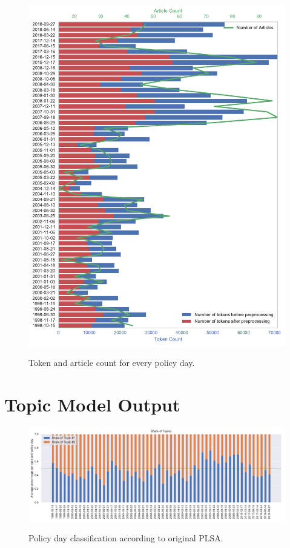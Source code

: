 \documentclass[11pt,a4paper,english,oneside]{book}
\numberwithin{equation}{chapter}
\begin{document}
\begin{figure}
	\caption{Token and article count for every policy day.}
	\centering
	\includegraphics[scale=1]{Images/tokencount.pdf}
	\label{tokencount}
\end{figure}

\renewcommand{\theequation}{C.\arabic{equation}}


\chapter{Topic Model Output}\label{AppendixC}

\begin{figure}
	\caption{Policy day classification according to original PLSA.}
	\centering
	\includegraphics[scale=0.8]{Images/plsamodelling_orig.pdf}
	\label{classPLSA}
\end{figure}
\end{document}
